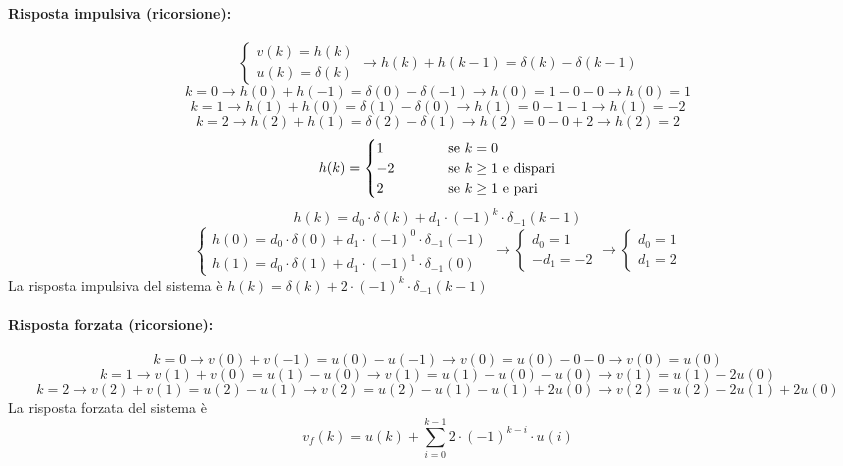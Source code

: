\documentclass[a4paper]{article}
\begin{document}
	\paragraph{Risposta impulsiva (ricorsione):}
	\[
	\begin{cases}
		v(k) = h(k) \\
		u(k) = \delta(k)
	\end{cases}
	\longrightarrow
	h(k) + h(k-1) = \delta(k) - \delta(k-1)
	\]
	\[
	k=0
	\longrightarrow
	h(0) + h(-1) = \delta(0) - \delta(-1)
	\longrightarrow
	h(0) = 1 - 0 - 0
	\longrightarrow
	h(0) = 1
	\]
	\[
	k=1
	\longrightarrow
	h(1) + h(0) = \delta(1) - \delta(0)
	\longrightarrow
	h(1) = 0 - 1 - 1
	\longrightarrow
	h(1) = -2
	\]
	\[
	k=2
	\longrightarrow
	h(2) + h(1) = \delta(2) - \delta(1)
	\longrightarrow
	h(2) = 0 - 0 + 2
	\longrightarrow
	h(2) = 2
	\]
	\[
	h(k) =
	\begin{cases}
		1& \hspace{1.0cm} \text{se } k = 0 \\
		-2& \hspace{1.0cm} \text{se } k \geq 1 \text{ e dispari} \\
		2& \hspace{1.0cm} \text{se } k \geq 1 \text{ e pari}
	\end{cases}
	\]
	\[ h(k) = d_0 \cdot \delta(k) + d_1 \cdot (-1)^k \cdot \delta_{-1}(k-1) \]
	\[
	\begin{cases}
		h(0) = d_0 \cdot \delta(0) + d_1 \cdot (-1)^0 \cdot \delta_{-1}(-1) \\
		h(1) = d_0 \cdot \delta(1) + d_1 \cdot (-1)^1 \cdot \delta_{-1}(0)
	\end{cases}
	\longrightarrow
	\begin{cases}
		d_0 = 1 \\
		- d_1 = - 2
	\end{cases}
	\longrightarrow
	\begin{cases}
		d_0 = 1 \\
		d_1 = 2
	\end{cases}
	\]
	La risposta impulsiva del sistema è $h(k) = \delta(k) + 2 \cdot (-1)^k \cdot \delta_{-1}(k-1)$
	
	\paragraph{Risposta forzata (ricorsione):}
	\[
	k=0
	\longrightarrow
	v(0) + v(-1) = u(0) - u(-1)
	\longrightarrow
	v(0) = u(0) - 0 - 0
	\longrightarrow
	v(0) = u(0)
	\]
	\[
	k=1
	\longrightarrow
	v(1) + v(0) = u(1) - u(0)
	\longrightarrow
	v(1) = u(1) - u(0) - u(0)
	\longrightarrow
	v(1) = u(1) - 2u(0)
	\]
	\[
	k=2
	\longrightarrow
	v(2) + v(1) = u(2) - u(1)
	\longrightarrow
	v(2) = u(2) - u(1) - u(1) + 2u(0)
	\longrightarrow
	v(2) = u(2) - 2u(1) + 2u(0)
	\]
	La risposta forzata del sistema è
	\[ v_f(k) = u(k) + \sum_{i=0}^{k-1} 2 \cdot (-1)^{k-i} \cdot u(i) \]
\end{document}
